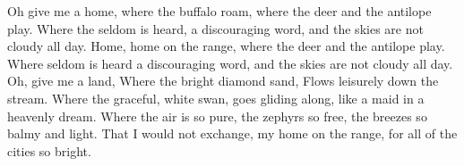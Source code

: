 \beginverse
Oh give me a home,
where the buffalo roam,
where the deer and the antilope play.
Where the seldom is heard,
a discouraging word,
and the skies are not cloudy all day.
\endverse
\beginchorus
Home, home on the range,
where the deer and the antilope play.
Where seldom is heard
a discouraging word,
and the skies are not cloudy all day.
\endchorus
\beginverse
Oh, give me a land,
Where the bright diamond sand, 
Flows leisurely down the stream.
Where the graceful, white swan,
goes gliding along,
like a maid in a heavenly dream.
\endverse
\beginverse
Where the air is so pure,
the zephyrs so free,
the breezes so balmy and light.
That I would not exchange,
my home on the range,
for all of the cities so bright.
\endverse
\endsong
